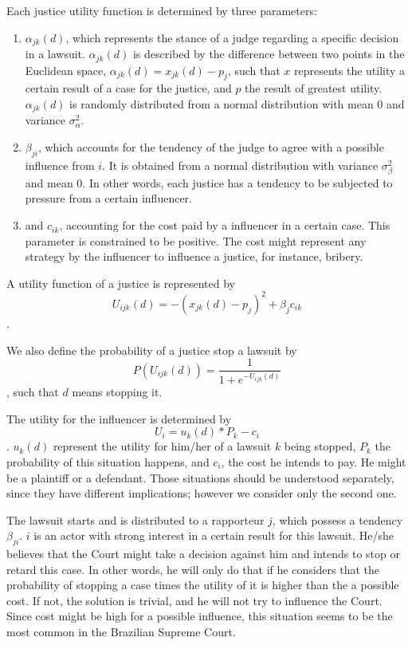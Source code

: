 \documentclass[12pt, a4paper]{article}
\begin{document}
Each justice utility function is determined by three parameters: \begin{enumerate} \item $\alpha_{jk}(d)$, which represents the stance of a judge regarding a specific decision in a lawsuit. $\alpha_{jk}(d)$ is described by the difference between two points in the Euclidean space, $\alpha_{jk}(d) = x_{jk}(d) - p_{j}$, such that $x$ represents the utility a certain result of a case for the justice, and $p$ the result of greatest utility. $\alpha_{jk}(d)$ is randomly distributed from a normal distribution with mean 0 and variance $\sigma_{\alpha}^2$. \item $\beta_{ji}$, which accounts for the tendency of the judge to agree with a possible influence from $i$. It is obtained from a normal distribution with variance $\sigma_{\beta}^2$ and mean 0. In other words, each justice has a tendency to be subjected to pressure from a certain influencer. \item and $c_{ik}$, accounting for the cost paid by a influencer in a certain case. This parameter is constrained to be positive. The cost might represent any strategy by the influencer to influence a justice, for instance, bribery.  \end{enumerate}  A utility function of a justice is represented by \begin{equation} U_{ijk}(d) = -(x_{jk}(d) - p_{j})^2  + \beta_j c_{ik} \end{equation}.  

We also define the probability of a justice stop a lawsuit by \begin{equation} P(U_{ijk}(d)) = \frac{1}{1+e^{-U_{ijk}(d)}}\end{equation}, such that $d$ means stopping it.


The utility for the influencer is determined by \begin{equation} U_{i} = u_{k}(d)*P_k - c_{i} \end{equation}. $u_{k}(d)$ represent the utility for him/her of a lawsuit $k$ being stopped, $P_k$ the probability of this situation happens, and $c_{i}$, the cost he intends to pay.   He might be a plaintiff or a defendant. Those situations should be understood separately, since they have different implications; however we consider only the second one.

The lawsuit starts and is distributed to a rapporteur $j$, which possess a tendency $\beta_{ji}$. $i$ is an actor with strong interest in a certain result for this lawsuit. He/she believes that the Court might take a decision against him and intends to stop or retard this case. In other words, he will only do that if he considers that the probability of stopping a case times the utility of it is higher than the a possible cost. If not, the solution is trivial, and he will not try to influence the Court. Since cost might be high for a possible influence, this situation seems to be the most common in the Brazilian Supreme Court.  
\end{document}
